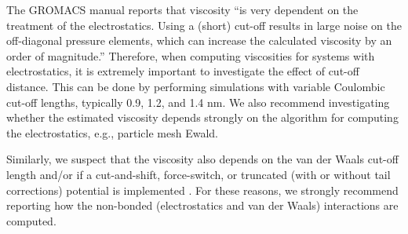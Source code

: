 \documentclass[9pt,bestpractices]{livecoms}
\begin{document}
The GROMACS manual reports that viscosity ``is very dependent on the treatment of the electrostatics. Using a (short) cut-off results in large noise on the off-diagonal pressure elements, which can increase the calculated viscosity by an order of magnitude.'' \cite{GROMACS,Hess2002} Therefore, when computing viscosities for systems with electrostatics, it is extremely important to investigate the effect of cut-off distance. This can be done by performing simulations with variable Coulombic cut-off lengths, typically 0.9, 1.2, and 1.4 nm. We also recommend investigating whether the estimated viscosity depends strongly on the algorithm for computing the electrostatics, e.g., particle mesh Ewald. \cite{GROMACS,Darden1993} 

Similarly, we suspect that the viscosity also depends on the van der Waals cut-off length and/or if a cut-and-shift, force-switch, or truncated (with or without tail corrections) potential is implemented \cite{GROMACS,Levitt1995,derSpoel2006}. For these reasons, we strongly recommend reporting how the non-bonded (electrostatics and van der Waals) interactions are computed. 
\end{document}
